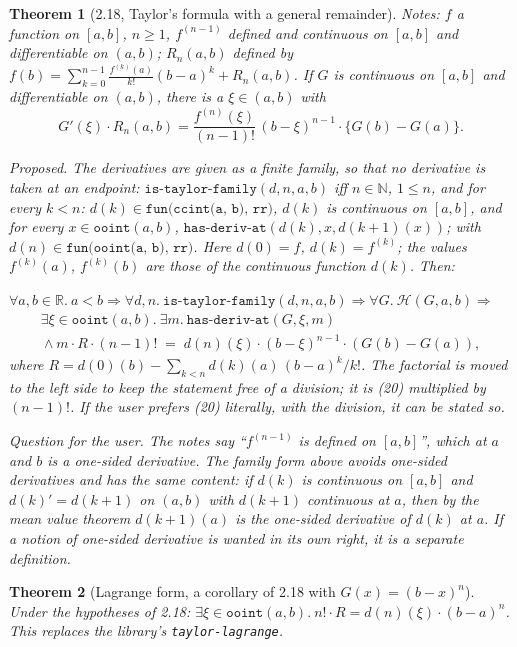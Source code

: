 \documentclass[11pt]{article}
\newtheorem{thm}{Theorem}
\theoremstyle{definition}
\newcommand{\vnb}[1]{\texttt{#1}}
\begin{document}
\begin{thm}[2.18, Taylor's formula with a general remainder]
\emph{Notes:} $f$ a function on $[a,b]$, $n \geq 1$, $f^{(n-1)}$ defined and continuous on $[a,b]$ and
differentiable on $(a,b)$; $R_n(a,b)$ defined by
$f(b) = \sum_{k=0}^{n-1} \frac{f^{(k)}(a)}{k!}(b-a)^k + R_n(a,b)$. If $G$ is continuous on $[a,b]$ and
differentiable on $(a,b)$, there is a $\xi \in (a,b)$ with
\[
G'(\xi) \cdot R_n(a,b) = \frac{f^{(n)}(\xi)}{(n-1)!}\,(b - \xi)^{n-1} \cdot \{G(b) - G(a)\}.
\tag{20}
\]

\emph{Proposed.} The derivatives are given as a finite family, so that no derivative is taken at
an endpoint: $\vnb{is-taylor-family}(d, n, a, b)$ iff $n \in \mathbb{N}$, $1 \leq n$, and for every
$k < n$: $d(k) \in \vnb{fun(ccint(a, b), rr)}$, $d(k)$ is continuous on $[a,b]$, and for every
$x \in \vnb{ooint}(a,b)$, $\vnb{has-deriv-at}(d(k), x, d(k+1)(x))$; with $d(n) \in
\vnb{fun(ooint(a, b), rr)}$. Here $d(0) = f$, $d(k) = f^{(k)}$; the values $f^{(k)}(a)$, $f^{(k)}(b)$
are those of the continuous function $d(k)$. Then:

$\forall a, b \in \mathbb{R}.\ a < b \Rightarrow \forall d, n.\ \vnb{is-taylor-family}(d, n, a, b)
\Rightarrow \forall G.\ \mathcal{H}(G, a, b) \Rightarrow$
\begin{gather*}
\exists \xi \in \vnb{ooint}(a,b).\ \exists m.\ \vnb{has-deriv-at}(G, \xi, m)\\ {}\wedge
m \cdot R \cdot (n-1)! \;=\; d(n)(\xi) \cdot (b - \xi)^{n-1} \cdot (G(b) - G(a)),
\end{gather*}
where $R = d(0)(b) - \sum_{k < n} d(k)(a)\,(b-a)^k / k!$. The factorial is moved to the left side
to keep the statement free of a division; it is (20) multiplied by $(n-1)!$. If the user prefers
(20) literally, with the division, it can be stated so.

\emph{Question for the user.} The notes say ``$f^{(n-1)}$ is defined on $[a,b]$'', which at $a$ and
$b$ is a one-sided derivative. The family form above avoids one-sided derivatives and has the same
content: if $d(k)$ is continuous on $[a,b]$ and $d(k)' = d(k+1)$ on $(a,b)$ with $d(k+1)$ continuous
at $a$, then by the mean value theorem $d(k+1)(a)$ \emph{is} the one-sided derivative of $d(k)$ at
$a$. If a notion of one-sided derivative is wanted in its own right, it is a separate definition.
\end{thm}

\begin{thm}[Lagrange form, a corollary of 2.18 with $G(x) = (b - x)^n$]
Under the hypotheses of 2.18: $\exists \xi \in \vnb{ooint}(a,b).\ n! \cdot R = d(n)(\xi) \cdot (b-a)^n$.
This replaces the library's \vnb{taylor-lagrange}.
\end{thm}
\end{document}

